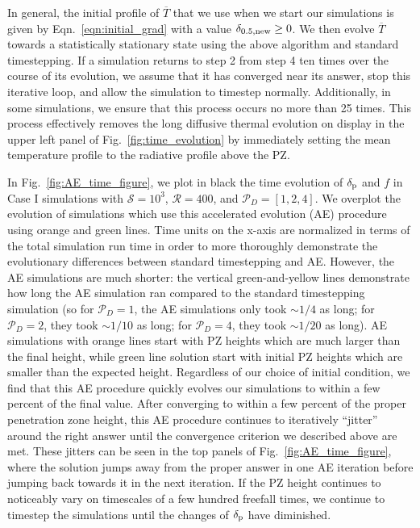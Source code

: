 \documentclass[twocolumn, linenumbers]{aastex631}
\newcommand{\delp}{\ensuremath{\delta_{\rm{p}}}}
\newcommand{\mP}{\ensuremath{\mathcal{P}}}
\newcommand{\mR}{\ensuremath{\mathcal{R}}}
\newcommand{\mS}{\ensuremath{\mathcal{S}}}
\renewcommand{\bar}[1]{\overline{#1}}
\begin{document}
In general, the initial profile of $\bar{T}$ that we use when we start our simulations is given by Eqn.~\ref{eqn:initial_grad} with a value $\delta_{0.5,\rm{new}} \geq 0$.
We then evolve $\bar{T}$ towards a statistically stationary state using the above algorithm and standard timestepping.
If a simulation returns to step 2 from step 4 ten times over the course of its evolution, we assume that it has converged near its answer, stop this iterative loop, and allow the simulation to timestep normally.
Additionally, in some simulations, we ensure that this process occurs no more than 25 times.
This process effectively removes the long diffusive thermal evolution on display in the upper left panel of Fig.~\ref{fig:time_evolution} by immediately setting the mean temperature profile to the radiative profile above the PZ.

In Fig.~\ref{fig:AE_time_figure}, we plot in black the time evolution of $\delp$ and $f$ in Case I simulations with $\mS = 10^3$, $\mR = 400$, and $\mP_D = [1,2,4]$.
We overplot the evolution of simulations which use this accelerated evolution (AE) procedure using orange and green lines.
Time units on the x-axis are normalized in terms of the total simulation run time in order to more thoroughly demonstrate the evolutionary differences between standard timestepping and AE.
However, the AE simulations are much shorter: the vertical green-and-yellow lines demonstrate how long the AE simulation ran compared to the standard timestepping simulation (so for $\mP_D = 1$, the AE simulations only took $\sim 1/4$ as long; for $\mP_D = 2$, they took $\sim 1/10$ as long; for $\mP_D = 4$, they took $\sim 1/20$ as long).
AE simulations with orange lines start with PZ heights which are much larger than the final height, while green line solution start with initial PZ heights which are smaller than the expected height.
Regardless of our choice of initial condition, we find that this AE procedure quickly evolves our simulations to within a few percent of the final value.
After converging to within a few percent of the proper penetration zone height, this AE procedure continues to iteratively ``jitter'' around the right answer until the convergence criterion we described above are met.
These jitters can be seen in the top panels of Fig.~\ref{fig:AE_time_figure}, where the solution jumps away from the proper answer in one AE iteration before jumping back towards it in the next iteration.
If the PZ height continues to noticeably vary on timescales of a few hundred freefall times, we continue to timestep the simulations until the changes of $\delp$ have diminished.
\end{document}
